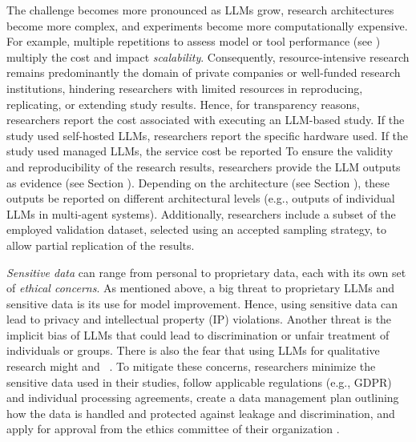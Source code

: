 The challenge becomes more pronounced as LLMs grow, research architectures become more complex, and experiments become more computationally expensive.
For example, multiple repetitions to assess model or tool performance (see \benchmarksmetrics) multiply the cost and impact \emph{scalability}.
Consequently, resource-intensive research remains predominantly the domain of private companies or well-funded research institutions, hindering researchers with limited resources in reproducing, replicating, or extending study results.
Hence, for transparency reasons, researchers \should report the cost associated with executing an LLM-based study. 
If the study used self-hosted LLMs, researchers \should report the specific hardware used. 
If the study used managed LLMs, the service cost \should be reported
To ensure the validity and reproducibility of the research results, researchers \must provide the LLM outputs as evidence (see Section \prompts).
Depending on the architecture (see Section \toolarchitecture), these outputs \should be reported on different architectural levels (e.g., outputs of individual LLMs in multi-agent systems).
Additionally, researchers \should include a subset of the employed validation dataset, selected using an accepted sampling strategy, to allow partial replication of the results.

\emph{Sensitive data} can range from personal to proprietary data, each with its own set of \emph{ethical concerns}.
As mentioned above, a big threat to proprietary LLMs and sensitive data is its use for model improvement.
Hence, using sensitive data can lead to privacy and intellectual property (IP) violations.
Another threat is the implicit bias of LLMs that could lead to discrimination or unfair treatment of individuals or groups.
There is also the fear that using LLMs for qualitative research might  and ~\cite{jowsey2025reject}.
To mitigate these concerns, researchers \should minimize the sensitive data used in their studies, \must follow applicable regulations (e.g., GDPR) and individual processing agreements, \should create a data management plan outlining how the data is handled and protected against leakage and discrimination, and \added{\should}\removed{\must} apply for approval from the ethics committee of their organization . 

